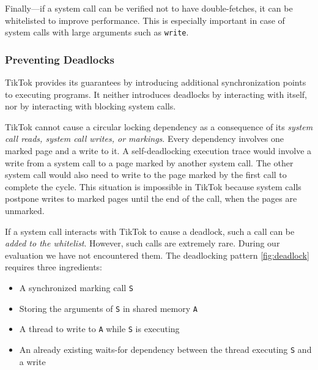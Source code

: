 \documentclass[conference]{IEEEtran}
\newcommand{\sysname}{TikTok}
\begin{document}
Finally---if a system call can be verified not to have double-fetches, it can
be whitelisted to improve performance. This is especially important in case of
system calls with large arguments such as \texttt{write}.

\subsubsection{Preventing Deadlocks}
\label{subsubsec:deadlocks}

\sysname{} provides its guarantees by introducing additional synchronization
points to executing programs. It neither introduces deadlocks
by interacting with itself, nor
by interacting with blocking system calls.

\sysname{} cannot cause a circular locking dependency as a consequence of its
\emph{system call reads, system call writes, or markings}. Every dependency
involves one marked page and a write to it. A self-deadlocking execution trace
would involve a write from a system call to a page marked by another
system call. The other system call would also need to write to the page marked
by the first call to complete the cycle. This situation is impossible in
\sysname{} because system calls postpone writes to marked pages until the end of
the call, when the pages are unmarked.

If a system call interacts with \sysname{} to cause a deadlock, such a call can
be \emph{added to the whitelist}. However, such calls are extremely rare.
During our evaluation we have not encountered them. The deadlocking pattern
\autoref{fig:deadlock} requires three ingredients:

\begin{itemize}
  \item A synchronized marking call \texttt{S}
  \item Storing the arguments of \texttt{S} in shared memory \texttt{A}
  \item A thread to write to \texttt{A} while \texttt{S} is executing
  \item An already existing waits-for dependency between the thread executing
  \texttt{S} and a write
\end{itemize}
\end{document}
